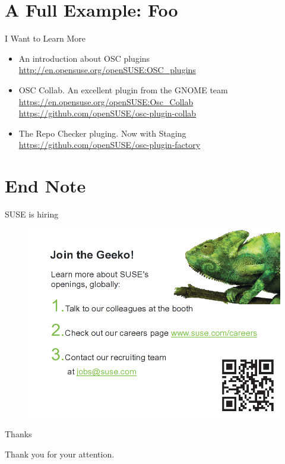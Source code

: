 \documentclass{beamer}
\begin{document}
\section{A Full Example: Foo}

\begin{frame}{I Want to Learn More}
  \begin{itemize}
  \item An introduction about OSC plugins\newline
    {\small\url{http://en.opensuse.org/openSUSE:OSC_plugins}}
  \item OSC Collab. An excellent plugin from the GNOME team\newline
    {\small\url{https://en.opensuse.org/openSUSE:Osc_Collab}}
    {\small\url{https://github.com/openSUSE/osc-plugin-collab}}
  \item The Repo Checker pluging. Now with Staging\newline
    {\small\url{https://github.com/openSUSE/osc-plugin-factory}}
  \end{itemize}
\end{frame}

\section{End Note}

\begin{frame}{SUSE is hiring}
  \begin{figure}
    \includegraphics[width= 0.8\linewidth]{suse_hiring.png}
  \end{figure}
\end{frame}

\begin{frame}{Thanks}
  \begin{center}
    Thank you for your attention.
  \end{center}
\end{frame}
\end{document}
